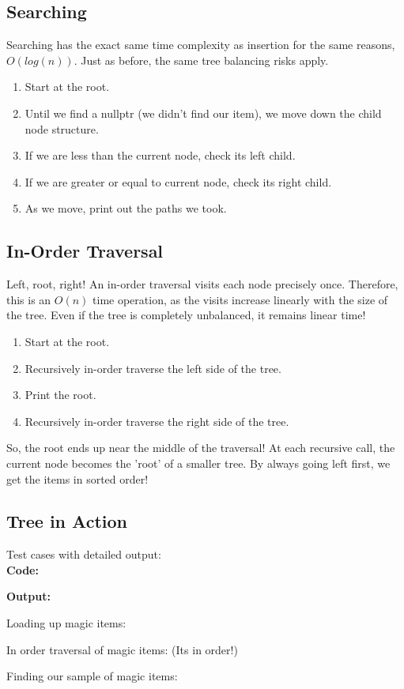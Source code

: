 \documentclass[letterpaper, 10pt]{article}
\begin{document}
\subsection{Searching}
Searching has the exact same time complexity as insertion for the same reasons, $O(log(n))$. Just as before, the same tree balancing risks apply.
\begin{enumerate}
    \item Start at the root.
    \item Until we find a nullptr (we didn't find our item), we move down the child node structure.
    \item If we are less than the current node, check its left child.
    \item If we are greater or equal to current node, check its right child.
    \item As we move, print out the paths we took.
\end{enumerate}


\subsection{In-Order Traversal}
Left, root, right! An in-order traversal visits each node precisely once. Therefore, this is an $O(n)$ time operation, as the visits increase linearly with the size of the tree. Even if the tree is completely unbalanced, it remains linear time!
\begin{enumerate}
    \item Start at the root.
    \item Recursively in-order traverse the left side of the tree.
    \item Print the root.
    \item Recursively in-order traverse the right side of the tree.
\end{enumerate}
So, the root ends up near the middle of the traversal! At each recursive call, the current node becomes the 'root' of a smaller tree. By always going left first, we get the items in sorted order!


\subsection{Tree in Action}
Test cases with detailed output: \\
\textbf{Code:}

\textbf{Output:}

\noindent
Loading up magic items: 

In order traversal of magic items: (Its in order!)

Finding our sample of magic items:

\end{document}
